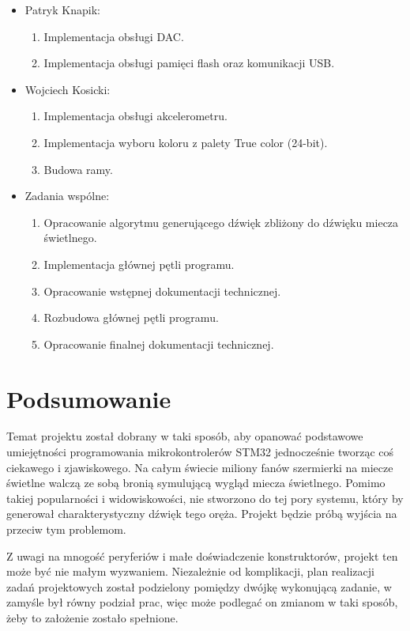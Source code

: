 \documentclass[10pt, a4paper]{article}
\begin{document}
	\begin{itemize}
		\item Patryk Knapik:
			\begin{enumerate}
				\item Implementacja obsługi DAC.
				\item Implementacja obsługi pamięci flash oraz komunikacji USB.
			\end{enumerate}
		\item Wojciech Kosicki:
			\begin{enumerate}
				\item Implementacja obsługi akcelerometru.
				\item Implementacja wyboru koloru z palety True color (24-bit).
				\item Budowa ramy.
			\end{enumerate}
		\item Zadania wspólne:
			\begin{enumerate}
				\item Opracowanie algorytmu generującego dźwięk zbliżony do dźwięku miecza świetlnego.
				\item Implementacja głównej pętli programu.
				\item Opracowanie wstępnej dokumentacji technicznej.
				\item Rozbudowa głównej pętli programu.
				\item Opracowanie finalnej dokumentacji technicznej.
			\end{enumerate}
	\end{itemize}

\section{Podsumowanie}
Temat projektu został dobrany w taki sposób, aby opanować podstawowe umiejętności programowania mikrokontrolerów STM32 jednocześnie tworząc coś ciekawego i zjawiskowego. Na całym świecie miliony fanów szermierki na miecze świetlne walczą ze sobą bronią symulującą wygląd miecza świetlnego. Pomimo takiej popularności i widowiskowości, nie stworzono do tej pory systemu, który by generował charakterystyczny dźwięk tego oręża. Projekt będzie próbą wyjścia na przeciw tym problemom. 

Z uwagi na mnogość peryferiów i małe doświadczenie konstruktorów, projekt ten może być nie małym wyzwaniem.
Niezależnie od komplikacji, plan realizacji zadań projektowych został podzielony pomiędzy dwójkę wykonującą zadanie, w zamyśle był równy podział prac, więc może podlegać on zmianom w taki sposób, żeby to założenie zostało spełnione.
\newpage
{}


\end{document}

